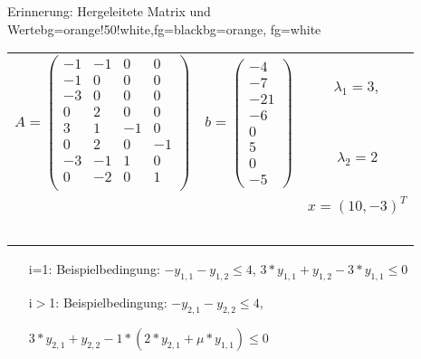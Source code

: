 \begin{frame}
	\begin{variableblock}{Erinnerung: Hergeleitete Matrix und Werte}{bg=orange!50!white,fg=black}{bg=orange, fg=white}
		\begin{tabular}{llc}
			\multirow{2}{*}{$A=\begin{pmatrix}
				-1 		& -1 		&  0		& 0		 \\
				-1 		& 0 		&  0		& 0		 \\
				-3 		& 0 		&  0		& 0		 \\
				0 		& 2 		&  0		& 0		 \\
				3 		& 1 		&  -1		& 0		 \\
				0 		& 2 		&  0		& -1	 \\
				-3 		& -1 		&  1		& 0		 \\
				0 		& -2 		&  0		& 1	 	 \\
				\end{pmatrix}$}&\multirow{2}{*}{$ b=\begin{pmatrix}
				-4 \\ -7 \\ -21 \\ -6 \\ 0 \\ 5 \\ 0 \\ -5
				\end{pmatrix} $}& $\lambda_1 = 3,$ \\
			& &  $\lambda_2 = 2$\\
			& & $x=(10, -3)^T$ \\
			& & \\
			& & \\
			& & \\
			& & \\
			& & \\
		\end{tabular}
	\end{variableblock}
	\begin{example}
		\begin{itemize}
			\setlength{\itemindent}{0.25cm}
			\item[i=1:] Beispielbedingung: $-y_{1,1}-y_{1,2}\le 4$, $3*y_{1,1}+y_{1,2}-3*y_{1,1}\le0$
			\item[i$>$1:] Beispielbedingung: $-y_{2,1}-y_{2,2}\le 4$, 
			\item[] $3*y_{2,1}+y_{2,2}-1*(2*y_{2,1}+\mu*y_{1,1})\le0$
		\end{itemize}
	\end{example}
\end{frame}




